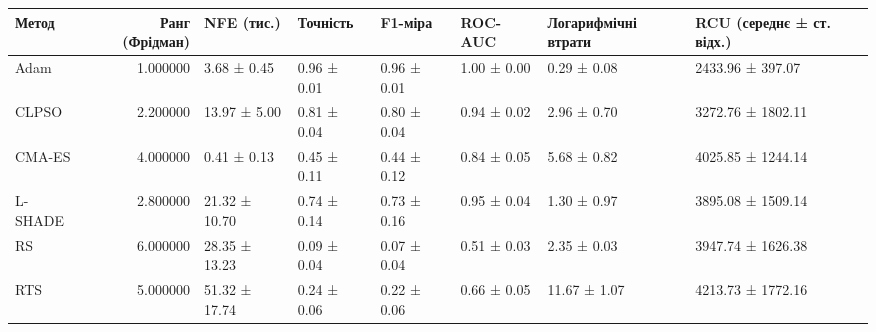 \begin{tabular}{lrllllll}
\toprule
Метод & Ранг (Фрідман) & NFE (тис.) & Точність & F1-міра & ROC-AUC & Логарифмічні втрати & RCU (середнє ± ст. відх.) \\
\midrule
Adam & 1.000000 & 3.68 ± 0.45 & 0.96 ± 0.01 & 0.96 ± 0.01 & 1.00 ± 0.00 & 0.29 ± 0.08 & 2433.96 ± 397.07 \\
CLPSO & 2.200000 & 13.97 ± 5.00 & 0.81 ± 0.04 & 0.80 ± 0.04 & 0.94 ± 0.02 & 2.96 ± 0.70 & 3272.76 ± 1802.11 \\
CMA-ES & 4.000000 & 0.41 ± 0.13 & 0.45 ± 0.11 & 0.44 ± 0.12 & 0.84 ± 0.05 & 5.68 ± 0.82 & 4025.85 ± 1244.14 \\
L-SHADE & 2.800000 & 21.32 ± 10.70 & 0.74 ± 0.14 & 0.73 ± 0.16 & 0.95 ± 0.04 & 1.30 ± 0.97 & 3895.08 ± 1509.14 \\
RS & 6.000000 & 28.35 ± 13.23 & 0.09 ± 0.04 & 0.07 ± 0.04 & 0.51 ± 0.03 & 2.35 ± 0.03 & 3947.74 ± 1626.38 \\
RTS & 5.000000 & 51.32 ± 17.74 & 0.24 ± 0.06 & 0.22 ± 0.06 & 0.66 ± 0.05 & 11.67 ± 1.07 & 4213.73 ± 1772.16 \\
\bottomrule
\end{tabular}
